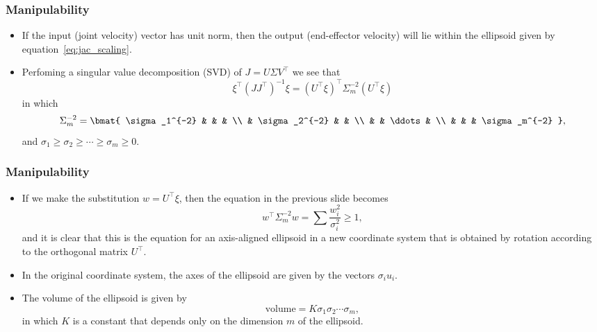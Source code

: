 \begin{frame}
    \frametitle{Manipulability}

    \begin{itemize}
        \item If the input (joint velocity) vector has unit norm, then the
        output (end-effector velocity) will lie within the ellipsoid given by 
        equation~\eqref{eq:jac_scaling}.
        \item Perfoming a singular value decomposition (SVD) of $J = U\Sigma
        V^\top$ we see that
        \[ \xi^\top \left(JJ^\top\right)^{-1}\xi = \left( U^\top \xi
        \right)^\top \Sigma_m^{-2}\left( U^\top \xi \right) \] in which 
        \[
        \Sigma_m^{-2} = \bmat{
            \sigma_1^{-2} & & & \\
            & \sigma_2^{-2} & & \\
            & & \ddots & \\
            & & & \sigma_m^{-2}
        },
        \] and $\sigma_1 \geq \sigma_2 \geq \cdots \geq \sigma_m \geq 0$.
    \end{itemize}
\end{frame}


\begin{frame}
    \frametitle{Manipulability}

    \begin{itemize}
        \item If we make the substitution $w = U^\top \xi$, then the equation in
        the previous slide becomes \[ w^\top \Sigma_m^{-2}w = \sum
        \frac{w_i^2}{\sigma_i^2} \geq 1, \] and it is clear that this is the
        equation for an axis-aligned ellipsoid in a new coordinate system that
        is obtained by rotation according to the orthogonal matrix $U^\top$.
        \item In the original coordinate system, the axes of the ellipsoid are
        given by the vectors $\sigma_i u_i$.
        \item The volume of the ellipsoid is given by
        \[ \textrm{volume} = K\sigma_1\sigma_2 \cdots \sigma_m, \] in which $K$
        is a constant that depends only on the dimension $m$ of the ellipsoid.
    \end{itemize}
\end{frame}

